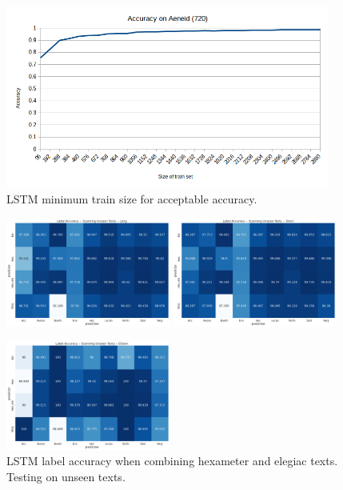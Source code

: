 \begin{figure}[H]
    \centering
    \includegraphics[width=0.95\textwidth]{img/lstm/lstm_minimum_train_set.png}

    \caption{LSTM minimum train size for acceptable accuracy.}
    \label{fig:exp_architecture}
\end{figure}

\begin{figure}[H]
    \centering
    \includegraphics[width=0.48\textwidth]{img/lstm/lstm_unseen_texts-long.png}
    \quad
    \includegraphics[width=0.48\textwidth]{img/lstm/lstm_unseen_texts-short.png}

    \includegraphics[width=0.48\textwidth]{img/lstm/lstm_unseen_texts-elision.png}

		\caption{LSTM label accuracy when combining hexameter and elegiac texts. Testing on unseen texts.}
    \label{fig:exp_architecture}
\end{figure}

